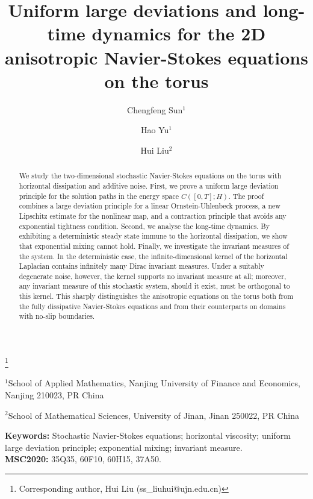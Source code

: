 \documentclass[11pt,a4paper,reqno]{amsart}
\theoremstyle{definition}
\begin{document}
\title[2D anisotropic Navier-Stokes equations on the torus]{Uniform large deviations and long-time dynamics for
       the 2D anisotropic Navier-Stokes equations on the torus}
\author{Chengfeng Sun$^{1}$}
\author{Hao Yu$^{1}$}
\author{Hui Liu$^{2}$}\thanks{Corresponding author, Hui Liu (ss\_liuhui@ujn.edu.cn)}
\maketitle
         $^{1}$School of Applied Mathematics,
         Nanjing University of Finance and Economics,
         Nanjing 210023, PR China


         $^{2}$School of Mathematical Sciences,
         University of Jinan,
         Jinan 250022, PR China
\begin{abstract}
  We study the two-dimensional stochastic Navier-Stokes equations on the torus
  with horizontal dissipation and additive noise.
  First, we prove a uniform large deviation principle for the solution
  paths in the energy space $C([0,T];H).$  The proof combines a large deviation principle for a linear
  Ornstein-Uhlenbeck process, a new Lipschitz estimate for the nonlinear map, and a contraction
  principle that avoids any exponential tightness condition. Second, we analyse the long-time dynamics.  By exhibiting a deterministic
  steady state immune to the horizontal dissipation, we show that exponential
  mixing cannot hold.
  Finally, we investigate the invariant measures of the system.  In the deterministic case,
  the infinite-dimensional kernel of the
  horizontal Laplacian contains infinitely many Dirac invariant measures.
  Under a suitably degenerate noise, however, the kernel supports no invariant
  measure at all; moreover, any invariant measure of this stochastic
  system, should it exist, must be orthogonal to this kernel.
  This sharply distinguishes the anisotropic equations on the torus both from the fully
  dissipative Navier-Stokes equations and from their counterparts on domains
  with no-slip boundaries.
\end{abstract}

\noindent\textbf{Keywords:} Stochastic Navier-Stokes equations; horizontal viscosity;
uniform large deviation principle; exponential mixing; invariant measure.\\
\noindent\textbf{MSC2020:} 35Q35, 60F10, 60H15, 37A50.
\vspace{1em}
\end{document}
